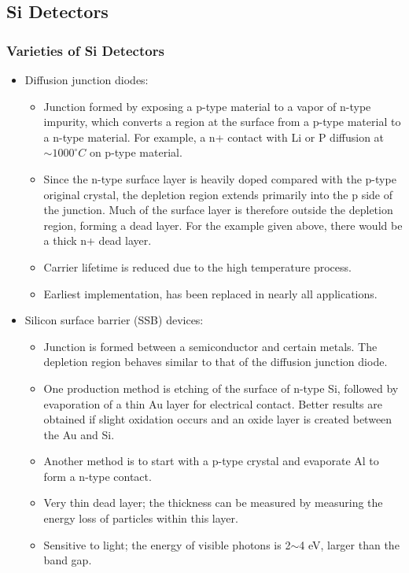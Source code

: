\subsection{Si Detectors}
\subsubsection{Varieties of Si Detectors}
\begin{itemize}
    \item Diffusion junction diodes:
    \begin{itemize}
        \item Junction formed by exposing a p-type material to a vapor of n-type impurity, which converts a region at the surface from a p-type material to a n-type material. For example, a n+ contact with Li or P diffusion at $\sim1000^\circ C$ on p-type material.
        \item Since the n-type surface layer is heavily doped compared with the p-type original crystal, the depletion region extends primarily into the p side of the junction. Much of the surface layer is therefore outside the depletion region, forming a dead layer. For the example given above, there would be a thick n+ dead layer.
        \item Carrier lifetime is reduced due to the high temperature process. 
        \item Earliest implementation, has been replaced in nearly all applications.
    \end{itemize}
    \item Silicon surface barrier (SSB) devices:
    \begin{itemize}
        \item Junction is formed between a semiconductor and certain metals. The depletion region behaves similar to that of the diffusion junction diode. 
        \item One production method is etching of the surface of n-type Si, followed by evaporation of a thin Au layer for electrical contact. Better results are obtained if slight oxidation occurs and an oxide layer is created between the Au and Si.
        \item Another method is to start with a p-type crystal and evaporate Al to form a n-type contact. 
        \item Very thin dead layer; the thickness can be measured by measuring the energy loss of particles within this layer. 
        \item Sensitive to light; the energy of visible photons is 2$\sim$4 eV, larger than the band gap.

\end{itemize}
\end{itemize}

